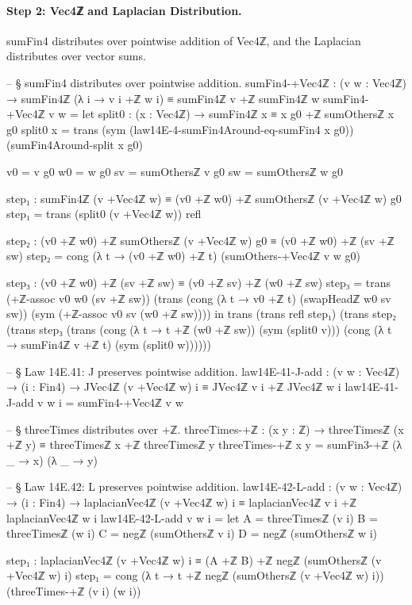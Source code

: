 \documentclass[11pt,a4paper]{book}
\def\texttt#1{#1}%
\begin{document}
\paragraph{Step 2: Vec4ℤ and Laplacian Distribution.}
\texttt{sumFin4} distributes over pointwise addition of \texttt{Vec4ℤ},
and the Laplacian distributes over vector sums.

\begin{code}
-- § sumFin4 distributes over pointwise addition.
sumFin4-+Vec4ℤ : (v w : Vec4ℤ) →
  sumFin4ℤ (λ i → v i +ℤ w i) ≡ sumFin4ℤ v +ℤ sumFin4ℤ w
sumFin4-+Vec4ℤ v w =
  let
    split0 : (x : Vec4ℤ) → sumFin4ℤ x ≡ x g0 +ℤ sumOthersℤ x g0
    split0 x =
      trans
        (sym (law14E-4-sumFin4Around-eq-sumFin4 x g0))
        (sumFin4Around-split x g0)

    v0 = v g0
    w0 = w g0
    sv = sumOthersℤ v g0
    sw = sumOthersℤ w g0

    step₁ : sumFin4ℤ (v +Vec4ℤ w) ≡ (v0 +ℤ w0) +ℤ sumOthersℤ (v +Vec4ℤ w) g0
    step₁ = trans (split0 (v +Vec4ℤ w)) refl

    step₂ : (v0 +ℤ w0) +ℤ sumOthersℤ (v +Vec4ℤ w) g0 ≡ (v0 +ℤ w0) +ℤ (sv +ℤ sw)
    step₂ = cong (λ t → (v0 +ℤ w0) +ℤ t) (sumOthers-+Vec4ℤ v w g0)

    step₃ : (v0 +ℤ w0) +ℤ (sv +ℤ sw) ≡ (v0 +ℤ sv) +ℤ (w0 +ℤ sw)
    step₃ =
      trans
        (+ℤ-assoc v0 w0 (sv +ℤ sw))
        (trans
          (cong (λ t → v0 +ℤ t) (swapHeadℤ w0 sv sw))
          (sym (+ℤ-assoc v0 sv (w0 +ℤ sw))))
  in
  trans
    (trans refl step₁)
    (trans
      step₂
      (trans
        step₃
        (trans
          (cong (λ t → t +ℤ (w0 +ℤ sw)) (sym (split0 v)))
          (cong (λ t → sumFin4ℤ v +ℤ t) (sym (split0 w))))))

-- § Law 14E.41: J preserves pointwise addition.
law14E-41-J-add : (v w : Vec4ℤ) → (i : Fin4) →
  JVec4ℤ (v +Vec4ℤ w) i ≡ JVec4ℤ v i +ℤ JVec4ℤ w i
law14E-41-J-add v w i = sumFin4-+Vec4ℤ v w

-- § threeTimes distributes over +ℤ.
threeTimes-+ℤ : (x y : ℤ) → threeTimesℤ (x +ℤ y) ≡ threeTimesℤ x +ℤ threeTimesℤ y
threeTimes-+ℤ x y =
  sumFin3-+ℤ (λ _ → x) (λ _ → y)

-- § Law 14E.42: L preserves pointwise addition.
law14E-42-L-add : (v w : Vec4ℤ) → (i : Fin4) →
  laplacianVec4ℤ (v +Vec4ℤ w) i ≡ laplacianVec4ℤ v i +ℤ laplacianVec4ℤ w i
law14E-42-L-add v w i =
  let
    A = threeTimesℤ (v i)
    B = threeTimesℤ (w i)
    C = negℤ (sumOthersℤ v i)
    D = negℤ (sumOthersℤ w i)

    step₁ : laplacianVec4ℤ (v +Vec4ℤ w) i ≡ (A +ℤ B) +ℤ negℤ (sumOthersℤ (v +Vec4ℤ w) i)
    step₁ = cong (λ t → t +ℤ negℤ (sumOthersℤ (v +Vec4ℤ w) i)) (threeTimes-+ℤ (v i) (w i))


\end{code}
\end{document}
